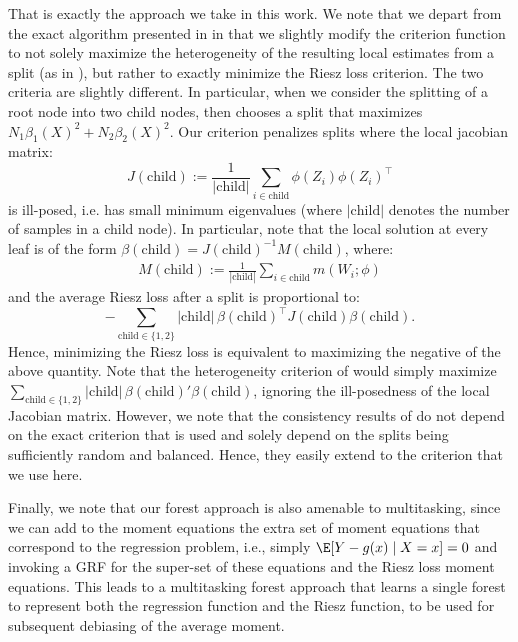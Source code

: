 \documentclass[nohyperref]{article}
\newcommand{\child}{\ensuremath{\mathrm{child}}}
\theoremstyle{plain}
\theoremstyle{definition}
\theoremstyle{remark}
\begin{document}
That is exactly the approach we take in this work. We note that we depart from the exact algorithm presented in \citet{athey2019generalized} in that we slightly modify the criterion function to not solely maximize the heterogeneity of the resulting local estimates from a split (as in \citealp{athey2019generalized}), but rather to exactly minimize the Riesz loss criterion. The two criteria are slightly different. In particular, when we consider the splitting of a root node into two child nodes, then \citet{athey2019generalized} chooses a split that maximizes $N_1 \beta_1(X)^2 + N_2 \beta_2(X)^2$. Our criterion penalizes splits where the local jacobian matrix:
$$J(\text{child}) := \frac{1}{|\text{child}|}\sum_{i\in \text{child}} \phi(Z_i) \phi(Z_i)^\top$$
is ill-posed, i.e. has small minimum eigenvalues (where $|\text{child}|$ denotes the number of samples in a child node). In particular, note that the local solution at every leaf is of the form $\beta(\text{child}) =  J(\child)^{-1} M(\child)$, where: \begin{align*} M(\child) := \textstyle{\frac{1}{|\child|} \sum_{i\in \child} m(W_i;\phi)}
\end{align*}
and the average Riesz loss after a split is proportional to:
$$- \sum_{\child \in \{1, 2\}} |\child|\, \beta(\child)^\top J(\child) \beta(\child).$$
Hence, minimizing the Riesz loss is equivalent to maximizing the negative of the above quantity. Note that the heterogeneity criterion of \citet{athey2019generalized} would simply maximize $\sum_{\child \in \{1, 2\}} |\child|\, \beta(\child)'\beta(\child)$, ignoring the ill-posedness of the local Jacobian matrix. However, we note that the consistency results of \citet{athey2019generalized} do not depend on the exact criterion that is used and solely depend on the splits being sufficiently random and balanced. Hence, they easily extend to the criterion that we use here.

Finally, we note that our forest approach is also amenable to multitasking, since we can add to the moment equations the extra set of moment equations that correspond to the regression problem, i.e., simply $\E[Y - g(x)\mid X=x]=0$ and invoking a GRF for the super-set of these equations and the Riesz loss moment equations. This leads to a multitasking forest approach that learns a single forest to represent both the regression function and the Riesz function, to be used for subsequent debiasing of the average moment.
\end{document}
